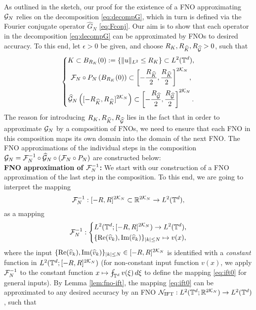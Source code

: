 \documentclass[reqno,a4paper]{amsart}
\begin{document}
As outlined in the sketch, our proof for the existence of a FNO approximating $\mathcal{G}_N$ relies on the decomposition \eqref{eq:decompG}, which in turn is defined via the Fourier conjugate operator $\hat{G}_N$ \eqref{eq:Fconj}. Our aim is to show that each operator in the decomposition \eqref{eq:decompG} can be approximated by FNOs to desired accuracy. To this end, let $\epsilon > 0$ be given, and choose $R_K, R_{\widehat{K}}, R_{\widehat{\mathcal{G}}} > 0$, such that 
\begin{align} \label{eq:subsets}
\left\{
\begin{gathered}
K \subset B_{R_K}(0) := \{\Vert u \Vert_{L^2}\le R_K\} \subset L^2(\mathbb{T}^d), 
\\
\mathcal{F}_N \circ P_N \left( B_{R_K}(0) \right)
\subset 
\left[
-\frac{R_{\widehat{K}}}{2}, \frac{R_{\widehat{K}}}{2}
\right]^{2\mathcal{K}_N}, 
\\
\widehat{\mathcal{G}}_N\left(
[-R_{\widehat{K}}, R_{\widehat{K}}]^{2\mathcal{K}_N}
\right)
\subset
\left[
-\frac{R_{\widehat{\mathcal{G}}}}{2}, \frac{R_{\widehat{\mathcal{G}}}}{2}
\right]^{2\mathcal{K}_N}.
\end{gathered}
\right.
\end{align}
The reason for introducing $R_K, R_{\widehat{K}}, R_{\widehat{\mathcal{G}}}$ lies in the fact that in order to approximate $\mathcal{G}_N$ by a composition of FNOs, we need to ensure that each FNO in this composition maps its own domain into the domain of the next FNO. The FNO approximations of the individual steps in the composition $\mathcal{G}_N = \mathcal{F}_N^{-1} \circ \widehat{\mathcal{G}}_N \circ (\mathcal{F}_N \circ P_N)$ are constructed below: \\
\textbf{FNO approximation of $\mathcal{F}_N^{-1}$:} We start with our construction of a FNO approximation of the last step in the composition. To this end, we are going to interpret the mapping 
\[
\mathcal{F}_N^{-1}: [-R,R]^{2\mathcal{K}_N} \subset \mathbb{R}^{2\mathcal{K}_N} \to L^2(\mathbb{T}^d),
\]
as a mapping 
\begin{align} \label{eq:ift0}
\mathcal{F}_N^{-1}:
\left\{
\begin{aligned}
&L^2(\mathbb{T}^d; [-R,R]^{2\mathcal{K}_N}) \to L^2(\mathbb{T}^d),
\\
&\{\mathrm{Re}(\widehat{v}_k), \mathrm{Im}(\widehat{v}_k)\}_{|k|\le N} \mapsto v(x),
\end{aligned}
\right.
\end{align}
where the input $\{\mathrm{Re}(\widehat{v}_k), \mathrm{Im}(\widehat{v}_k)\}_{|k|\le N} \in [-R,R]^{2\mathcal{K}_N}$ is identified with a \emph{constant} function in $L^2(\mathbb{T}^d;[-R,R]^{2 \mathcal{K}_N})$ (for non-constant input function $v(x)$, we apply $\mathcal{F}_N^{-1}$ to the constant function $x \mapsto \fint_{\T^d} v(\xi) \, d\xi$ to define the mapping \eqref{eq:ift0} for general inputs). By Lemma \ref{lem:fno-ift}, the mapping \eqref{eq:ift0} can be approximated to any desired accuracy by an FNO $\mathcal{N}_{\mathrm{IFT}}: L^2(\mathbb{T}^d; \mathbb{R}^{2\mathcal{K}_N}) \to L^2(\mathbb{T}^d)$, such that 
\end{document}
